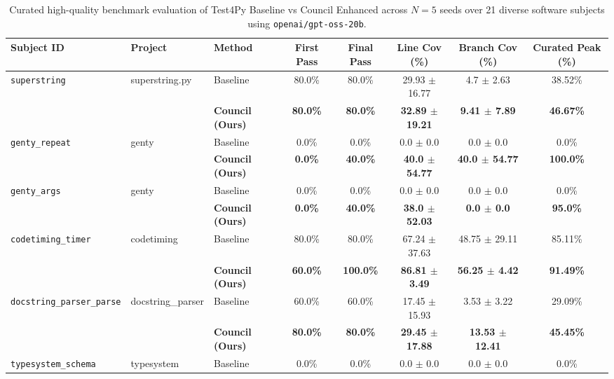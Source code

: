 \begin{table}[t]
\centering
\small
\caption{Curated high-quality benchmark evaluation of Test4Py Baseline vs Council Enhanced across $N=5$ seeds over 21 diverse software subjects using \texttt{openai/gpt-oss-20b}.}
\label{tab:curated_21_eval}
\begin{tabular}{lll c c c c c}
\toprule
\textbf{Subject ID} & \textbf{Project} & \textbf{Method} & \textbf{First Pass} & \textbf{Final Pass} & \textbf{Line Cov (\%)} & \textbf{Branch Cov (\%)} & \textbf{Curated Peak (\%)} \\
\midrule
\multirow{2}{*}{\texttt{superstring}} & \multirow{2}{*}{superstring.py} & Baseline & 80.0\% & 80.0\% & 29.93 $\pm$ 16.77 & 4.7 $\pm$ 2.63 & 38.52\% \\
 & & \textbf{Council (Ours)} & \textbf{80.0\%} & \textbf{80.0\%} & \textbf{32.89 $\pm$ 19.21} & \textbf{9.41 $\pm$ 7.89} & \textbf{46.67\%} \\
\midrule
\multirow{2}{*}{\texttt{genty\_repeat}} & \multirow{2}{*}{genty} & Baseline & 0.0\% & 0.0\% & 0.0 $\pm$ 0.0 & 0.0 $\pm$ 0.0 & 0.0\% \\
 & & \textbf{Council (Ours)} & \textbf{0.0\%} & \textbf{40.0\%} & \textbf{40.0 $\pm$ 54.77} & \textbf{40.0 $\pm$ 54.77} & \textbf{100.0\%} \\
\midrule
\multirow{2}{*}{\texttt{genty\_args}} & \multirow{2}{*}{genty} & Baseline & 0.0\% & 0.0\% & 0.0 $\pm$ 0.0 & 0.0 $\pm$ 0.0 & 0.0\% \\
 & & \textbf{Council (Ours)} & \textbf{0.0\%} & \textbf{40.0\%} & \textbf{38.0 $\pm$ 52.03} & \textbf{0.0 $\pm$ 0.0} & \textbf{95.0\%} \\
\midrule
\multirow{2}{*}{\texttt{codetiming\_timer}} & \multirow{2}{*}{codetiming} & Baseline & 80.0\% & 80.0\% & 67.24 $\pm$ 37.63 & 48.75 $\pm$ 29.11 & 85.11\% \\
 & & \textbf{Council (Ours)} & \textbf{60.0\%} & \textbf{100.0\%} & \textbf{86.81 $\pm$ 3.49} & \textbf{56.25 $\pm$ 4.42} & \textbf{91.49\%} \\
\midrule
\multirow{2}{*}{\texttt{docstring\_parser\_parse}} & \multirow{2}{*}{docstring\_parser} & Baseline & 60.0\% & 60.0\% & 17.45 $\pm$ 15.93 & 3.53 $\pm$ 3.22 & 29.09\% \\
 & & \textbf{Council (Ours)} & \textbf{80.0\%} & \textbf{80.0\%} & \textbf{29.45 $\pm$ 17.88} & \textbf{13.53 $\pm$ 12.41} & \textbf{45.45\%} \\
\midrule
\multirow{2}{*}{\texttt{typesystem\_schema}} & \multirow{2}{*}{typesystem} & Baseline & 0.0\% & 0.0\% & 0.0 $\pm$ 0.0 & 0.0 $\pm$ 0.0 & 0.0\% \\

\end{tabular}
\end{table}
